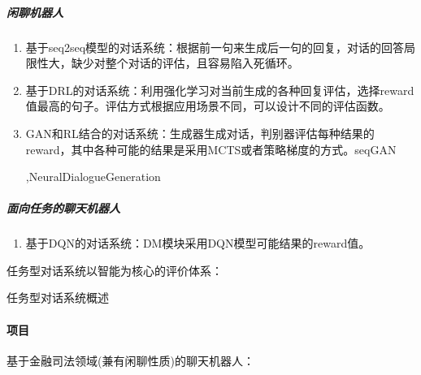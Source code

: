 \documentclass[letterpaper,10pt,english]{sphinxmanual}
\begin{document}
\subparagraph{闲聊机器人}
\label{\detokenize{chapter_AI_dive/chatbot:id10}}\begin{enumerate}
%
\item {} 
基于seq2seq模型的对话系统：根据前一句来生成后一句的回复，对话的回答局限性大，缺少对整个对话的评估，且容易陷入死循环。

\item {} 
基于DRL的对话系统：利用强化学习对当前生成的各种回复评估，选择reward值最高的句子。评估方式根据应用场景不同，可以设计不同的评估函数。

\item {} 
GAN和RL结合的对话系统：生成器生成对话，判别器评估每种结果的reward，其中各种可能的结果是采用MCTS或者策略梯度的方式。seqGAN%
\begin{footnote}[966]\sphinxAtStartFootnote
{}
%
\end{footnote},Neural\sphinxhyphen{}Dialogue\sphinxhyphen{}Generation%
\begin{footnote}[967]\sphinxAtStartFootnote
{}
%
\end{footnote}

\end{enumerate}


\subparagraph{面向任务的聊天机器人}
\label{\detokenize{chapter_AI_dive/chatbot:id11}}\begin{enumerate}
%
\item {} 
基于DQN的对话系统：DM模块采用DQN模型可能结果的reward值。

\end{enumerate}

任务型对话系统以智能为核心的评价体系：

任务型对话系统概述%
\begin{footnote}[968]\sphinxAtStartFootnote
{}
%
\end{footnote}


\paragraph{项目}
\label{\detokenize{chapter_AI_dive/chatbot:id12}}
基于金融\sphinxhyphen{}司法领域(兼有闲聊性质)的聊天机器人：
\end{document}
